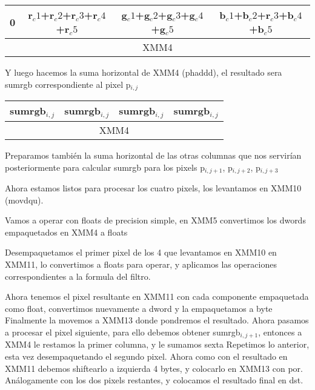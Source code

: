 \begin{table}[!h]
	\centering
	\begin{tabular}{| c | c | c | c |}
		\hline
		0 & r$_c1$+r$_c2$+r$_c3$+r$_c4$+r$_c5$ & g$_c1$+g$_c2$+g$_c3$+g$_c4$+g$_c5$ & b$_c1$+b$_c2$+r$_c3$+b$_c4$+b$_c5$
		\\ \hline
		\multicolumn{4}{c}{XMM4} \\
	\end{tabular}
\end{table}

Y luego hacemos la suma horizontal de XMM4 (phaddd), el resultado sera sumrgb correspondiente al pixel p$_{i,j}$

\begin{table}[!h]
	\centering
	\begin{tabular}{| c | c | c | c |}
		\hline
		sumrgb$_{i,j}$ & sumrgb$_{i,j}$ & sumrgb$_{i,j}$ & sumrgb$_{i,j}$
		\\ \hline
		\multicolumn{4}{c}{XMM4} \\
	\end{tabular}
\end{table}

Preparamos también la suma horizontal de las otras columnas que nos servirían posteriormente para calcular sumrgb para los pixels p$_{i,j+1}$, p$_{i,j+2}$, p$_{i,j+3}$

Ahora estamos listos para procesar los cuatro pixels, los levantamos en XMM10 (movdqu).


Vamos a operar con floats de precision simple, en XMM5 convertimos los dwords empaquetados en XMM4 a floats


Desempaquetamos el primer pixel de los 4 que levantamos en XMM10 en XMM11, lo convertimos a floats para operar, y aplicamos las operaciones correspondientes a la formula del filtro.


Ahora tenemos el pixel resultante en XMM11 con cada componente empaquetada como float, convertimos nuevamente a dword y la empaquetamos a byte
%
Finalmente la movemos a XMM13 donde pondremos el resultado.
%
Ahora pasamos a procesar el pixel siguiente, para ello debemos obtener sumrgb$_{i,j+1}$, entonces a XMM4 le restamos la primer columna, y le sumamos sexta
%
Repetimos lo anterior, esta vez desempaquetando el segundo pixel.
%
Ahora como con el resultado en XMM11 debemos shiftearlo a izquierda 4 bytes, y colocarlo en XMM13 con por.
%
Análogamente con los dos pixels restantes, y colocamos el resultado final en dst.
%

